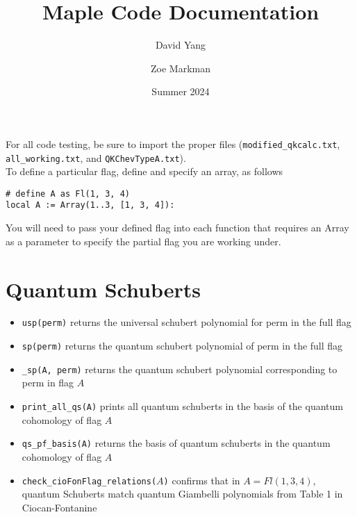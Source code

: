 \documentclass[11pt]{article}
\begin{document}
\title{\textbf{Maple Code Documentation}}
\author{David Yang \and Zoe Markman}
\date{Summer 2024}

\maketitle

For all code testing, be sure to import the proper files (\texttt{modified\_qkcalc.txt}, \texttt{all\_working.txt}, and \texttt{QKChevTypeA.txt}). \\

To define a particular flag, define and specify an array, as follows
\begin{lstlisting}[language = Maple]
# define A as Fl(1, 3, 4)
local A := Array(1..3, [1, 3, 4]):
\end{lstlisting}

You will need to pass your defined flag into each function that requires an Array as a parameter to specify the partial flag you are working under.

\section{Quantum Schuberts}
\begin{itemize}
    \item \texttt{usp(perm)} returns the universal schubert polynomial for perm in the full flag
    \item \texttt{sp(perm)} returns the quantum schubert polynomial of perm in the full flag
    \item \texttt{\_sp(A, perm)} returns the quantum schubert polynomial corresponding to perm in flag $A$
    \item \texttt{print\_all\_qs(A)} prints all quantum schuberts in the basis of the quantum cohomology of flag $A$
    \item \texttt{qs\_pf\_basis(A)} returns the basis of quantum schuberts in the quantum cohomology of flag $A$
    \item \texttt{check\_cioFonFlag\_relations($A$)} confirms that in $A = Fl(1, 3, 4)$, quantum Schuberts match quantum Giambelli polynomials from Table 1 in Ciocan-Fontanine
\end{itemize}
\end{document}
